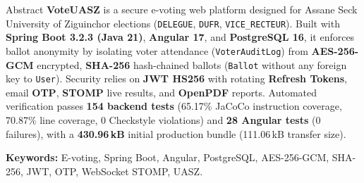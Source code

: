 \documentclass[11pt,a4paper]{report}
\begin{document}
\begin{uaszbox}{Abstract}
\textbf{VoteUASZ} is a secure e-voting web platform designed for Assane Seck University of Ziguinchor elections (\texttt{DELEGUE}, \texttt{DUFR}, \texttt{VICE\_RECTEUR}). Built with \textbf{Spring Boot 3.2.3 (Java 21)}, \textbf{Angular 17}, and \textbf{PostgreSQL 16}, it enforces ballot anonymity by isolating voter attendance (\texttt{VoterAuditLog}) from \textbf{AES-256-GCM} encrypted, \textbf{SHA-256} hash-chained ballots (\texttt{Ballot} without any foreign key to \texttt{User}). Security relies on \textbf{JWT HS256} with rotating \textbf{Refresh Tokens}, email \textbf{OTP}, \textbf{STOMP} live results, and \textbf{OpenPDF} reports. Automated verification passes \textbf{154 backend tests} (65.17\% JaCoCo instruction coverage, 70.87\% line coverage, 0 Checkstyle violations) and \textbf{28 Angular tests} (0 failures), with a \textbf{430.96\,kB} initial production bundle (111.06\,kB transfer size).

\medskip
\noindent\textbf{Keywords:} E-voting, Spring Boot, Angular, PostgreSQL, AES-256-GCM, SHA-256, JWT, OTP, WebSocket STOMP, UASZ.
\end{uaszbox}
\end{document}
